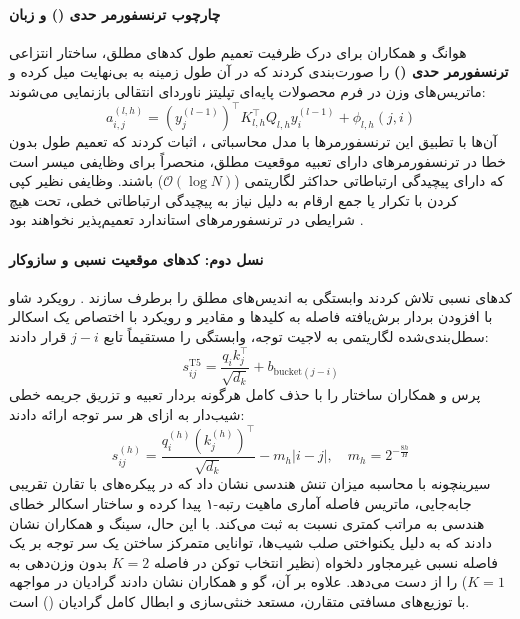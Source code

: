 \paragraph*{چارچوب ترنسفورمر حدی () و زبان }
هوانگ و همکاران \cite{huang2025formal} برای درک ظرفیت تعمیم طول کدهای مطلق، ساختار انتزاعی \textbf{ترنسفورمر حدی ()} را صورت‌بندی کردند که در آن طول زمینه به بی‌نهایت میل کرده و ماتریس‌های وزن در فرم محصولات پایه‌ای تپلیتز ناوردای انتقالی بازنمایی می‌شوند:
\begin{equation}
    a_{i,j}^{(l,h)} = (y_j^{(l-1)})^\top K_{l,h}^\top Q_{l,h} y_i^{(l-1)} + \phi_{l,h}(j, i)
\end{equation}
آن‌ها با تطبیق این ترنسفورمرها با مدل محاسباتی ، اثبات کردند که تعمیم طول بدون خطا در ترنسفورمرهای دارای تعبیه موقعیت مطلق، منحصراً برای وظایفی میسر است که دارای پیچیدگی ارتباطاتی حداکثر لگاریتمی ($\mathcal{O}(\log N)$) باشند. وظایفی نظیر کپی کردن با تکرار  یا جمع ارقام به دلیل نیاز به پیچیدگی ارتباطاتی خطی، تحت هیچ شرایطی در ترنسفورمرهای استاندارد تعمیم‌پذیر نخواهند بود \cite{huang2025formal}.

\paragraph*{نسل دوم: کدهای موقعیت نسبی و سازوکار }
کدهای نسبی تلاش کردند وابستگی به اندیس‌های مطلق را برطرف سازند \cite{irani2026positional}. رویکرد شاو \cite{shaw2018self} با افزودن بردار برش‌یافته فاصله به کلیدها و مقادیر و رویکرد  \cite{raffel2020exploring} با اختصاص یک اسکالر سطل‌بندی‌شده لگاریتمی به لاجیت توجه، وابستگی را مستقیماً تابع $j-i$ قرار دادند:
\begin{equation}
    s_{ij}^{\text{T5}} = \frac{q_i k_j^\top}{\sqrt{d_k}} + b_{\text{bucket}(j - i)}
\end{equation}
پرس و همکاران \cite{press2022train} ساختار  را با حذف کامل هرگونه بردار تعبیه و تزریق جریمه خطی شیب‌دار به ازای هر سر توجه ارائه دادند:
\begin{equation}
    s_{ij}^{(h)} = \frac{q_i^{(h)} (k_j^{(h)})^\top}{\sqrt{d_k}} - m_h |i - j|, \quad m_h = 2^{-\frac{8h}{H}}
\end{equation}
سیرینچونه \cite{cirrincione2026geometry} با محاسبه میزان تنش هندسی نشان داد که در پیکره‌های با تقارن تقریبی جابه‌جایی، ماتریس فاصله آماری ماهیت رتبه-۱ پیدا کرده و ساختار اسکالر  خطای هندسی به مراتب کمتری نسبت به  ثبت می‌کند. با این حال، سینگ و همکاران \cite{singh2026relative} نشان دادند که  به دلیل یکنواختی صلب شیب‌ها، توانایی متمرکز ساختن یک سر توجه بر یک فاصله نسبی غیرمجاور دلخواه (نظیر انتخاب توکن در فاصله $K=2$ بدون وزن‌دهی به $K=1$) را از دست می‌دهد. علاوه بر آن، گو و همکاران \cite{gu2026deconstructing} نشان دادند گرادیان  در مواجهه با توزیع‌های مسافتی متقارن، مستعد خنثی‌سازی و ابطال کامل گرادیان () است.

